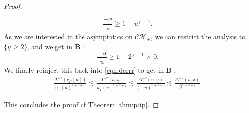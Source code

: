 \documentclass[reqno]{amsart}
\numberwithin{equation}{section}
\newcommand{\ubar}{{\underline{u}}}
\newcommand{\ch}{\mathcal{CH_+}}
\theoremstyle{plain}
\theoremstyle{definition}
\theoremstyle{remark}
\numberwithin{equation}{section}
\begin{document}
\begin{proof}
\begin{itemize}
    $$\frac{-u}{\ubar}\geq 1-\ubar^{\gamma'-1}.$$
    As we are interested in the asymptotics on $\ch$, we can restrict the analysis to $\{\ubar\geq 2\}$, and we get in $\mathbf{B}$ : 
    $$\frac{-u}{\ubar}\geq 1-2^{\gamma'-1}>0.$$
    We finally reinject this back into \eqref{eqn:derrr} to get in $\mathbf{B}$ :
    \begin{align*}
        \frac{\Delta^{-2}(r_\Gamma(u))}{\ubar_\Gamma(u)^{7+\delta+j}}\lesssim\frac{\Delta^{-2}(u,\ubar)}{\ubar_\Gamma(u)^{7+\delta+j}}\lesssim\frac{\Delta^{-2}(u,\ubar)}{(-u)^{7+\delta+j}}\lesssim\frac{\Delta^{-2}(u,\ubar)}{\ubar^{7+\delta+j}}.
    \end{align*}
\end{itemize}
This concludes the proof of Theorem \ref{thm:psip}.
\end{proof}
\end{document}
